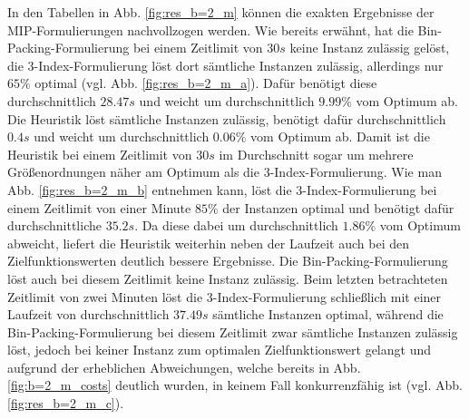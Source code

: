 In den Tabellen in Abb. \ref{fig:res_b=2_m} können die exakten Ergebnisse der MIP-Formulierungen nachvollzogen werden.
Wie bereits erwähnt, hat die Bin-Packing-Formulierung bei einem Zeitlimit von $30s$ keine Instanz zulässig gelöst, die 3-Index-Formulierung löst dort sämtliche Instanzen zulässig, allerdings nur $65 \%$ optimal (vgl. Abb. \ref{fig:res_b=2_m_a}). Dafür benötigt diese durchschnittlich $28.47s$ und weicht um durchschnittlich $9.99 \%$ vom Optimum ab.
Die Heuristik löst sämtliche Instanzen zulässig, benötigt dafür durchschnittlich $0.4s$ und weicht um durchschnittlich $0.06 \%$ vom Optimum ab. Damit ist die Heuristik bei einem Zeitlimit von $30s$ im Durchschnitt sogar um mehrere Größenordnungen näher am Optimum als die 3-Index-Formulierung. Wie man Abb. \ref{fig:res_b=2_m_b} entnehmen kann, löst die 3-Index-Formulierung bei einem Zeitlimit von einer Minute $85 \%$ der Instanzen optimal und benötigt dafür durchschnittliche $35.2s$. Da diese dabei um durchschnittlich $1.86 \%$ vom Optimum abweicht, liefert die Heuristik weiterhin neben der Laufzeit auch bei den Zielfunktionswerten deutlich bessere Ergebnisse. Die Bin-Packing-Formulierung löst auch bei diesem Zeitlimit keine Instanz zulässig. Beim letzten betrachteten Zeitlimit von zwei Minuten löst die 3-Index-Formulierung schließlich mit einer Laufzeit von durchschnittlich $37.49s$ sämtliche Instanzen optimal, während die Bin-Packing-Formulierung bei diesem Zeitlimit zwar sämtliche Instanzen zulässig löst, jedoch bei keiner Instanz zum optimalen Zielfunktionswert gelangt und aufgrund der erheblichen Abweichungen, welche bereits in Abb. \ref{fig:b=2_m_costs} deutlich wurden, in keinem Fall konkurrenzfähig ist (vgl. Abb. \ref{fig:res_b=2_m_c}).

\vfill
\pagebreak

